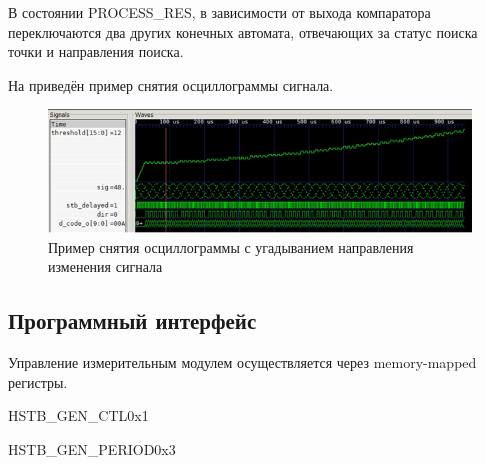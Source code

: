 В состоянии PROCESS\_RES, в зависимости от выхода компаратора переключаются два других конечных автомата, отвечающих за статус поиска точки и направления поиска.

На  приведён пример снятия осциллограммы сигнала.

\begin{figure}[ht!] 
	\center
	\includegraphics  {my_folder/images//p_find}
	\caption{Пример снятия осциллограммы с угадыванием направления изменения сигнала} 
	\label{fig:p-find}  
\end{figure}

\subsection{Программный интерфейс}

Управление измерительным модулем осуществляется через memory-mapped регистры.

\begin{register}{H}{STB\_GEN\_CTL}{0x1}%
\label{example}%
%
%
%
%
 \regnewline%

%
%
%
%
\regnewline%
\end{register}

\begin{register}{H}{STB\_GEN\_PERIOD}{0x3}%
\label{example}%
%
 \regnewline%
\end{register}





\newpage